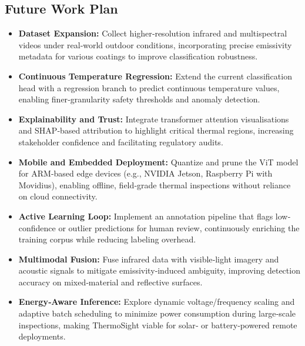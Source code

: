 \subsection{Future Work Plan}
\begin{itemize}
    \item \textbf{Dataset Expansion:}  
    Collect higher‐resolution infrared and multispectral videos under real‐world outdoor conditions, incorporating precise emissivity metadata for various coatings to improve classification robustness.  
    \item \textbf{Continuous Temperature Regression:}  
    Extend the current classification head with a regression branch to predict continuous temperature values, enabling finer‐granularity safety thresholds and anomaly detection.  
    \item \textbf{Explainability and Trust:}  
    Integrate transformer attention visualisations and SHAP‐based attribution to highlight critical thermal regions, increasing stakeholder confidence and facilitating regulatory audits.  
    \item \textbf{Mobile and Embedded Deployment:}  
    Quantize and prune the ViT model for ARM‐based edge devices (e.g., NVIDIA Jetson, Raspberry Pi with Movidius), enabling offline, field‐grade thermal inspections without reliance on cloud connectivity.  
    \item \textbf{Active Learning Loop:}  
    Implement an annotation pipeline that flags low‐confidence or outlier predictions for human review, continuously enriching the training corpus while reducing labeling overhead.  
    \item \textbf{Multimodal Fusion:}  
    Fuse infrared data with visible‐light imagery and acoustic signals to mitigate emissivity‐induced ambiguity, improving detection accuracy on mixed‐material and reflective surfaces.  
    \item \textbf{Energy‐Aware Inference:}  
    Explore dynamic voltage/frequency scaling and adaptive batch scheduling to minimize power consumption during large‐scale inspections, making ThermoSight viable for solar‐ or battery‐powered remote deployments.
\end{itemize}
